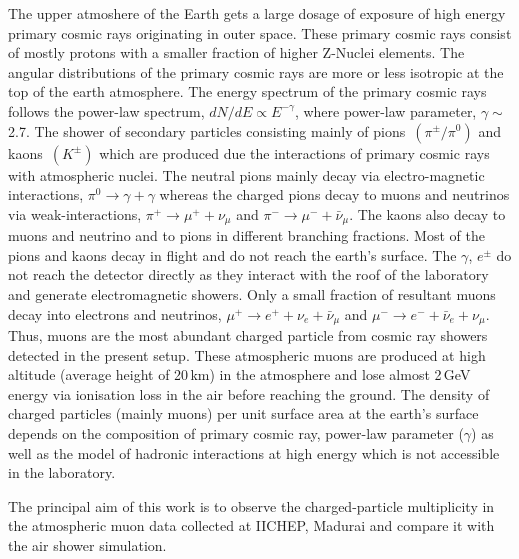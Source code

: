 The upper atmoshere of the Earth gets a large dosage of exposure of
high energy primary cosmic rays originating in outer space. These
primary cosmic rays consist of mostly protons with a smaller fraction
of higher \mbox{Z-Nuclei} elements\cite{cosmic1}. The angular
distributions of the primary cosmic rays are more or less isotropic
at the top of the earth atmosphere. The energy spectrum of the primary
cosmic rays follows the power-law spectrum, $dN/dE \propto E^{-\gamma}$,
where power-law parameter, $\gamma \sim $ 2.7. The shower of secondary
particles consisting mainly of
\mbox{pions $\left(\pi^{\pm}/\pi^0\right)$} and
\mbox{kaons $\left(K^{\pm}\right)$} which are produced due the
interactions of primary cosmic rays with atmospheric nuclei.
The neutral pions mainly decay via electro-magnetic interactions,
$\pi^0 \rightarrow \gamma+\gamma$ whereas the charged pions decay to
muons and neutrinos via weak-interactions,
$\pi^+ \rightarrow \mu^+ + \nu_{\mu}$ and
$\pi^- \rightarrow \mu^- + \bar{\nu}_{\mu}$. The kaons also decay to
muons and neutrino and to pions in different branching fractions.
Most of the pions and kaons decay in flight and do not reach the
earth's surface.
The $\gamma$, $e^{\pm}$ do not reach the detector directly as they
interact with the roof of the laboratory and generate electromagnetic
showers. Only a small fraction of resultant muons decay into
electrons and neutrinos, 
$\mu^+ \rightarrow e^+ + \nu_{e} + \bar{\nu}_{\mu}$ and 
$\mu^- \rightarrow e^- + \bar{\nu}_{e} + \nu_{\mu}$. Thus, muons are the
most abundant charged particle from cosmic ray showers detected in the
present setup. These atmospheric muons are produced at high altitude
(average height of 20\,km) in the atmosphere and lose almost 2\,GeV
energy via ionisation loss in the air before reaching the ground. The 
density of charged particles (mainly muons) per unit surface area at
the earth's surface depends on the composition of primary cosmic ray,
power-law parameter ($\gamma$) as well as the model of hadronic
interactions at high energy which is not accessible in the laboratory.

The principal aim of this work is to observe the charged-particle
multiplicity in the atmospheric muon data collected
at IICHEP, Madurai and compare it with the air shower simulation.


